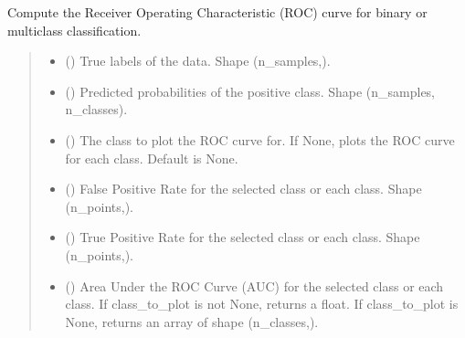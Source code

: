 \documentclass[letterpaper,10pt,english]{sphinxmanual}
\begin{document}
\begin{fulllineitems}
\label{\detokenize{calzone:calzone.utils.make_roc_curve}}
\pysigstartsignatures
{}
\pysigstopsignatures
\sphinxAtStartPar
Compute the Receiver Operating Characteristic (ROC) curve for binary or multiclass classification.
\begin{quote}\begin{description}
\begin{itemize}
\item {} 
\sphinxAtStartPar
{} () \textendash{} True labels of the data. Shape (n\_samples,).

\item {} 
\sphinxAtStartPar
{} () \textendash{} Predicted probabilities of the positive class. Shape (n\_samples, n\_classes).

\item {} 
\sphinxAtStartPar
{} (\sphinxstyleliteralemphasis{\sphinxupquote{, }}) \textendash{} The class to plot the ROC curve for. If None, plots the ROC curve for each class. Default is None.

\end{itemize}

\begin{itemize}
\item {} 
\sphinxAtStartPar
{} () \textendash{} False Positive Rate for the selected class or each class. Shape (n\_points,).

\item {} 
\sphinxAtStartPar
{} () \textendash{} True Positive Rate for the selected class or each class. Shape (n\_points,).

\item {} 
\sphinxAtStartPar
{} () \textendash{} Area Under the ROC Curve (AUC) for the selected class or each class. If class\_to\_plot is not None, returns a float. If class\_to\_plot is None, returns an array of shape (n\_classes,).


\end{itemize}
\end{description}
\end{quote}
\end{fulllineitems}
\end{document}
